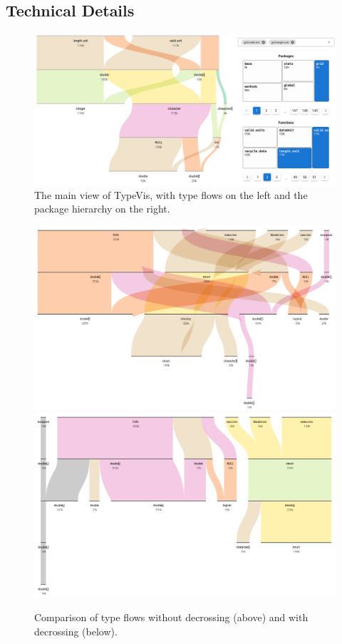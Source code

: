 \documentclass{vgtc}                          %
\begin{document}

\subsection{Technical Details}



\begin{figure}
 \centering
 \includegraphics[width=\linewidth]{img/typevis.png}
 \caption{The main view of {\sc TypeVis}, with type flows on the left and the package hierarchy on the right.}
 \label{fig:typevis}
\end{figure}

\begin{figure}[tb]
 \centering
 \includegraphics[width=\columnwidth]{img/no_decross.png}
 \includegraphics[width=\columnwidth]{img/decross.png}
 \caption{Comparison of type flows without decrossing (above) and with decrossing (below).}
 \label{fig:decross}
\end{figure}
\end{document}
